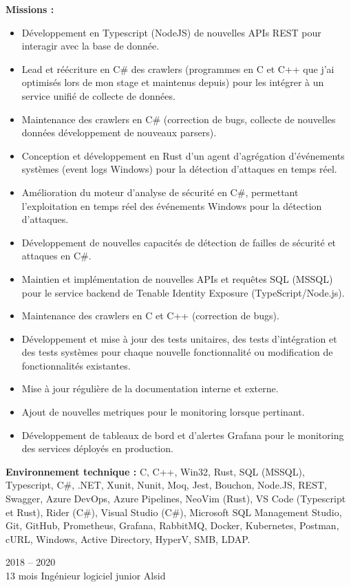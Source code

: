 \documentclass[8pt]{developercv} %
\begin{document}
\textbf{Missions :}
\begin{itemize}
    \item Développement en Typescript (NodeJS) de nouvelles APIs REST pour interagir avec la base de donnée.
    \item Lead et réécriture en C\# des crawlers (programmes en C et C++ que j'ai optimisés lors de mon stage et maintenus depuis) pour les intégrer à un service unifié de collecte de données.
    \item Maintenance des crawlers en C\# (correction de bugs, collecte de nouvelles données développement de nouveaux parsers).
    \item Conception et développement en Rust d'un agent d'agrégation d'événements systèmes (event logs Windows) pour la détection d'attaques en temps réel.
    \item Amélioration du moteur d'analyse de sécurité en C\#, permettant l'exploitation en temps réel des événements Windows pour la détection d'attaques.
    \item Développement de nouvelles capacités de détection de failles de sécurité et attaques en C\#.
    \item Maintien et implémentation de nouvelles APIs et requêtes SQL (MSSQL) pour le service backend de Tenable Identity Exposure (TypeScript/Node.js).
    \item Maintenance des crawlers en C et C++ (correction de bugs).
    \item Développement et mise à jour des tests unitaires, des tests d'intégration et des tests systèmes pour chaque nouvelle fonctionnalité ou modification de fonctionnalités existantes.
    \item Mise à jour régulière de la documentation interne et externe.
    \item Ajout de nouvelles metriques pour le monitoring lorsque pertinant.
    \item Développement de tableaux de bord et d'alertes Grafana pour le monitoring des services déployés en production.
\end{itemize}
\vspace{\baselineskip}
\textbf{Environnement technique :} C, C++, Win32, Rust, SQL (MSSQL), Typescript, C\#, .NET, Xunit, Nunit, Moq, Jest, Bouchon, Node.JS, REST, Swagger, Azure DevOps, Azure Pipelines, NeoVim (Rust), VS Code (Typescript et Rust), Rider (C\#), Visual Studio (C\#), Microsoft SQL Management Studio, Git, GitHub, Prometheus, Grafana, RabbitMQ, Docker, Kubernetes, Postman, cURL, Windows, Active Directory, HyperV, SMB, LDAP.\\
\vspace{\baselineskip}
\begin{entrylisthrules}
    \entry
    {2018 -- 2020\\\footnotesize{13 mois}}
    {Ingénieur logiciel junior}
    {Alsid}
    {}
\end{entrylisthrules}
\end{document}
